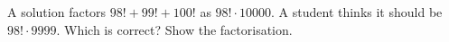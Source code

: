 A solution factors $98!+99!+100!$ as $98!\cdot10000$. A student thinks it should be $98!\cdot9999$. Which is correct? Show the factorisation.
